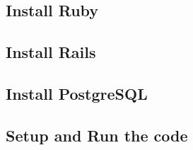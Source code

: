 \subsection*{Install Ruby}
\label{sect:installation:ruby}


\subsection*{Install Rails}
\label{sect:installation:rails}


\subsection*{Install PostgreSQL}
\label{sect:installation:postgresql}


\subsection*{Setup and Run the code}
\label{sect:installation:code}
